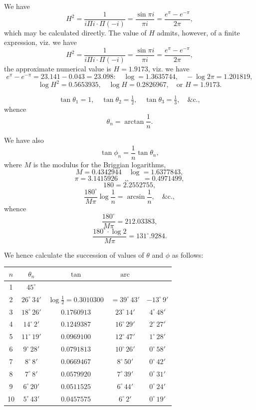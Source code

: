 \documentclass[12pt,a4paper]{article}
\theoremstyle{definition}
\begin{document}
We have
\[
H^2 = \frac{1}{i\Pi i \cdot \Pi(-i)} = \frac{\sin\pi i}{\pi i} = \frac{e^{\pi}-e^{-\pi}}{2\pi},
\]
which may be calculated directly. The value of $H$ admits, however, of a finite expression, viz. we have
\[
H^2 = \frac{1}{i\Pi i \cdot \Pi(-i)} = \frac{\sin\pi i}{\pi i} = \frac{e^{\pi}-e^{-\pi}}{2\pi},
\]
the approximate numerical value is $H=1.9173$, viz. we have
\[
e^{\pi}-e^{-\pi} = 23.141 - 0.043 = 23.098 : \quad \log = 1.3635744, \quad -\log 2\pi = 1.201819,
\]
\[
\log H^2 = 0.5653935, \quad \log H = 0.2826967, \quad \text{or } H = 1.9173.
\]

\[
\tan\theta_1 = 1, \quad \tan\theta_2 = \tfrac{1}{2}, \quad \tan\theta_3 = \tfrac{1}{3}, \quad \&\text{c.},
\]
whence
\[
\theta_n = \arctan\frac{1}{n}.
\]

We have also
\[
\tan\phi_n = \frac{1}{n}\tan\theta_n,
\]
where $M$ is the modulus for the Briggian logarithms,
\[
M = 0.4342944 \quad \log = 1.6377843,
\]
\[
\pi = 3.1415926 \quad \text{,,}\quad\quad = 0.4971499,
\]
\[
180 = 2.2552755,
\]
\[
\frac{180^{\circ}}{M\pi}\log\frac{1}{n} = \arcsin\frac{1}{n}, \quad \&\text{c.},
\]
whence
\[
\frac{180^{\circ}}{M\pi} = 212.03383,
\]
\[
\frac{180^{\circ}\cdot\log 2}{M\pi} = 131^{\circ}.9284.
\]

We hence calculate the succession of values of $\theta$ and $\phi$ as follows:

\begin{center}
\begin{tabular}{c|c|c|c|c}
\toprule
$n$ & $\theta_n$ & $\tan$ & $\operatorname{arc}$ & \\
\midrule
1 & $45^{\circ}$ & & & \\
2 & $26^{\circ}\,34'$ & $\log \tfrac{1}{2} = 0.3010300$ & $= 39^{\circ}\,43'$ & $-13^{\circ}\,9'$ \\
3 & $18^{\circ}\,26'$ & $0.1760913$ & $23^{\circ}\,14'$ & $4^{\circ}\,48'$ \\
4 & $14^{\circ}\,2'$ & $0.1249387$ & $16^{\circ}\,29'$ & $2^{\circ}\,27'$ \\
5 & $11^{\circ}\,19'$ & $0.0969100$ & $12^{\circ}\,47'$ & $1^{\circ}\,28'$ \\
6 & $9^{\circ}\,28'$ & $0.0791813$ & $10^{\circ}\,26'$ & $0^{\circ}\,58'$ \\
7 & $8^{\circ}\,8'$ & $0.0669467$ & $8^{\circ}\,50'$ & $0^{\circ}\,42'$ \\
8 & $7^{\circ}\,8'$ & $0.0579920$ & $7^{\circ}\,39'$ & $0^{\circ}\,31'$ \\
9 & $6^{\circ}\,20'$ & $0.0511525$ & $6^{\circ}\,44'$ & $0^{\circ}\,24'$ \\
10 & $5^{\circ}\,43'$ & $0.0457575$ & $6^{\circ}\,2'$ & $0^{\circ}\,19'$ \\
\bottomrule
\end{tabular}
\end{center}
\end{document}
